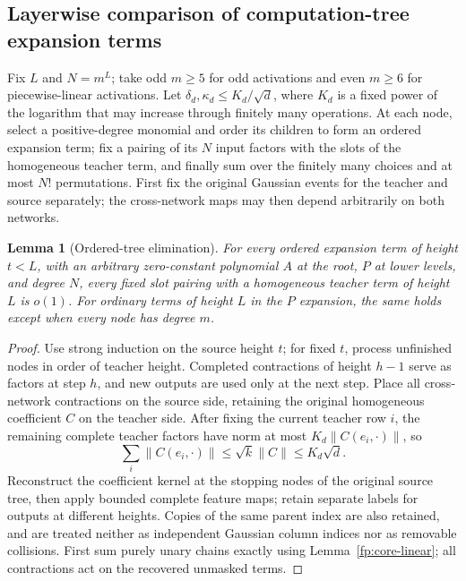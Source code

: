 \documentclass[a4paper]{tufte-handout}
\newtheorem{lemma}{Lemma}
\begin{document}
\begin{fullwidth}
\section{Layerwise comparison of computation-tree expansion terms}\label{fp:history}\label{app:cuts}
Fix $L$ and $N=m^L$; take odd $m\ge5$ for odd activations and even $m\ge6$ for piecewise-linear activations.
Let $\delta_d,\kappa_d\le K_d/\sqrt d$, where $K_d$ is a fixed power of the logarithm that may increase through finitely many operations.
At each node, select a positive-degree monomial and order its children to form an ordered expansion term; fix a pairing of its $N$ input factors
with the slots of the homogeneous teacher term, and finally sum over the finitely many choices and at most $N!$ permutations.
First fix the original Gaussian events for the teacher and source separately; the cross-network maps may then depend arbitrarily on both networks.

\begin{lemma}[Ordered-tree elimination]\label{fp:lowest-cut}\label{fp:permanent-mark}\label{fp:core-spectator}
For every ordered expansion term of height $t<L$, with an arbitrary zero-constant polynomial $A$ at the root, $P$ at lower levels, and degree $N$,
every fixed slot pairing with a homogeneous teacher term of height $L$ is $o(1)$.
For ordinary terms of height $L$ in the $P$ expansion, the same holds except when every node has degree $m$.
\end{lemma}
\begin{proof}
Use strong induction on the source height $t$; for fixed $t$, process unfinished nodes in order of teacher height.
Completed contractions of height $h-1$ serve as factors at step $h$, and new outputs are used only at the next step.
Place all cross-network contractions on the source side, retaining the original homogeneous coefficient $C$ on the teacher side.
After fixing the current teacher row $i$, the remaining complete teacher factors have norm at most $K_d\|C(e_i,\cdot)\|$, so
\begin{equation}\label{fp:teacher-slices}
 \sum_i\|C(e_i,\cdot)\|\le\sqrt{k}\|C\|\le K_d\sqrt d.
\end{equation}
Reconstruct the coefficient kernel at the stopping nodes of the original source tree, then apply bounded complete feature maps; retain separate labels for outputs at different heights. Copies of the same parent index are also retained, and are treated neither as independent Gaussian column indices nor as removable collisions.
First sum purely unary chains exactly using Lemma~\ref{fp:core-linear}; all contractions act on the recovered unmasked terms.


\end{proof}
\end{fullwidth}
\end{document}
